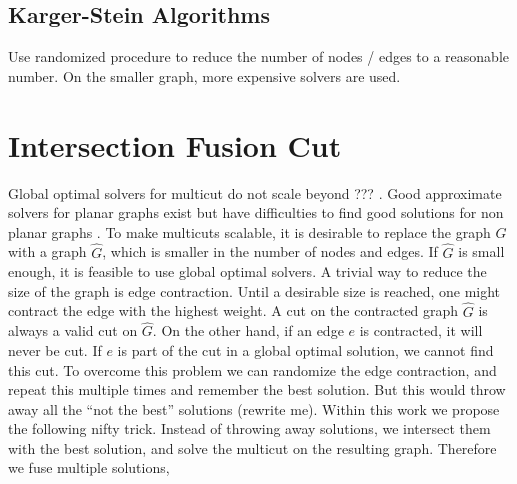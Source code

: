 \documentclass[10pt,twocolumn,letterpaper]{article}
\begin{document}
\subsection{Karger-Stein Algorithms}
Use randomized procedure to reduce the number of nodes / edges to a reasonable 
number.
On the smaller graph, more expensive solvers are used.



\section{Intersection Fusion Cut}

Global optimal solvers for multicut do not scale beyond ??? \cite{???}.
Good approximate solvers for planar graphs exist \cite{beier_2014_cvpr,yarkony_2012_eccv} 
but have difficulties to find good solutions for non planar graphs \cite{beier_2014_cvpr}.
%
To make multicuts scalable, it is desirable to replace the graph $G$
with a graph $\hat{G}$, which is smaller in the number of nodes and edges. 
If $\hat{G}$ is small enough, it is feasible to use global optimal solvers.
%
A trivial way to reduce the size of the graph  is edge contraction.
Until a desirable size is reached, one might contract the edge with
the highest weight. A cut on the contracted graph  $\hat{G}$ is always
a valid cut on $\hat{G}$.
%
On the other hand, if an edge $e$ is contracted, it will never be cut.
If $e$ is part of the cut in a global optimal solution, we cannot find
this cut.
%
To overcome this problem  we can randomize the edge contraction,
and repeat this multiple times and remember the best solution.
%
But this would throw away all the ``not the best'' solutions (rewrite me).
Within this work we propose the following nifty trick.
Instead of throwing away solutions, we intersect them with the 
best solution, and solve the multicut on the resulting
graph.
Therefore we fuse multiple solutions,
\end{document}
